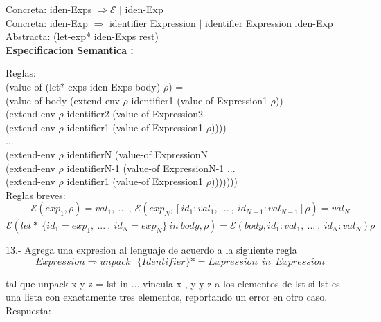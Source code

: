 \documentclass{article}
\begin{document}
Concreta: iden-Exps  $\Rightarrow \mathcal{E}$ $|$ iden-Exp \\

Concreta: iden-Exp $\Rightarrow$ identifier Expression $|$ identifier Expression iden-Exp \\

Abstracta: (let-exp* iden-Exps rest) \\

\textbf{Especificacion Semantica :} \newline

Reglas: \\

(value-of (let*-exps iden-Exps body) $\rho$) = \\
  (value-of body (extend-env $\rho$ identifier1 (value-of Expression1 $\rho$)) \\
                 (extend-env $\rho$ identifier2 (value-of Expression2 \\
                                                (extend-env $\rho$ identifier1 (value-of Expression1 $\rho$))))\\
                 ...\\
                 (extend-env $\rho$ identifierN (value-of ExpressionN \\
                                                (extend-env $\rho$ identifierN-1 (value-of ExpressionN-1 ... \\ 
                                                (extend-env $\rho$ identifier1 (value-of Expression1 $\rho$)))))))\\


Reglas breves: \\

$$ 
\frac{\mathcal{E}(exp_1, \rho) = val_1, \: ... \: , \: \mathcal{E}(exp_N, [id_1 : val_1, \: ... \: , \: id_{N-1} : val_{N-1}]\rho) = val_N}{\mathcal{E} (let*  \: \{ id_1 = exp_1, \: ... \: , \: id_N = exp_N \} \: in  \: body , \rho) = \mathcal{E}(body, id_1 : val_1, \: ... \: , \: id_N : val_N)\rho} 
$$

13.- Agrega una expresion al lenguaje de acuerdo a la siguiente regla\newline
$$
Expression \Rightarrow  unpack \:\: \:  \{Identifier\}* = Expression \:\:  in \: \:Expression
$$

tal que unpack x y z = lst in ... vincula x , y y z a los elementos de lst si lst es una lista con exactamente tres elementos, reportando un error en otro caso.\newline
Respuesta: \newline
\end{document}
